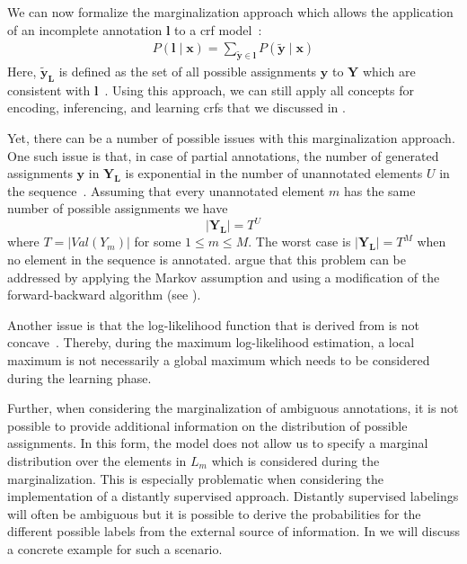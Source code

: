 We can now formalize the marginalization approach which allows the application of an incomplete annotation $\bm{l}$ to a \gls{crf} model~\citep{tsuboi2008training}:
\begin{equation}
  \label{equ:crf-marginalization}
  \begin{split}
    P\left(\bm{l}\mid\mathbf{x}\right)=\sum_{\mathbf{\tilde{y}}\in\bm{l}}P\left(\mathbf{\tilde{y}}\mid\mathbf{x}\right)
  \end{split}
\end{equation}
Here, $\mathbf{\tilde{y}}_{\mathbf{L}}$ is defined as the set of all possible assignments $\mathbf{y}$ to $\mathbf{Y}$ which are consistent with $\bm{l}$~\citep{tsuboi2008training}.
Using this approach, we can still apply all concepts for encoding, inferencing, and learning \glspl{crf} that we discussed in .

\bigskip

Yet, there can be a number of possible issues with this marginalization approach.
One such issue is that, in case of partial annotations, the number of generated assignments $\mathbf{y}$ in $\mathbf{Y}_{\mathbf{L}}$ is exponential in the number of unannotated elements $U$ in the sequence~\citep{tsuboi2008training}.
Assuming that every unannotated element $m$ has the same number of possible assignments we have
\begin{equation}
  \label{equ:marginalization-number-of-assingments}
  |\mathbf{Y}_{\mathbf{L}}|=T^U
\end{equation}
where $T=|Val\left(Y_m\right)|$ for some $1\leq m\leq M$.
The worst case is $|\mathbf{Y}_{\mathbf{L}}|=T^M$ when no element in the sequence is annotated.
\citep{tsuboi2008training} argue that this problem can be addressed by applying the Markov assumption and using a modification of the forward-backward algorithm (see ).


Another issue is that the log-likelihood function that is derived from  is not concave~\citep{tsuboi2008training}.
Thereby, during the maximum log-likelihood estimation, a local maximum is not necessarily a global maximum which needs to be considered during the learning phase.

Further, when considering the marginalization of ambiguous annotations, it is not possible to provide additional information on the distribution of possible assignments.
In this form, the model does not allow us to specify a \gls{marginal distribution} over the elements in $L_m$ which is considered during the marginalization.
This is especially problematic when considering the implementation of a distantly supervised approach.
Distantly supervised labelings will often be ambiguous but it is possible to derive the probabilities for the different possible labels from the external source of information.
In  we will discuss a concrete example for such a scenario.

